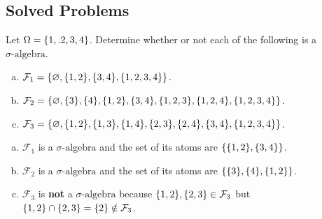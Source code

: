 \newpage

\subsection{Solved Problems}
\begin{problem}
	Let $ \Omega = \{1,.2,3,4\} $. Determine whether or not each of the following is a $\sigma\text{-algebra}$.
	\begin{enumerate}[(a)]
		\item $ \mathcal{F}_1 = \{\varnothing, \{1,2\},\{3,4\},\{1,2,3,4\}\} $.
		\item $ \mathcal{F}_2 = \{\varnothing,\{3\},\{4\},\{1,2\},\{3,4\},\{1,2,3\},\{1,2,4\},\{1,2,3,4\}\} $.
		\item $ \mathcal{F}_3 = \{\varnothing, \{1,2\},\{1,3\},\{1,4\},\{2,3\},\{2,4\},\{3,4\},\{1,2,3,4\}\} $.
	\end{enumerate}
\end{problem}
\begin{solution}
	\begin{enumerate}[(a)]
		$ \, $
		\item $ \mathcal{F}_1  $ is a $\sigma\text{-algebra}$ and the set of its atoms are $ \{\{1,2\},\{3,4\}\} $. 
		\item $ \mathcal{F}_2 $ is a $\sigma\text{-algebra}$ and the set of its atoms are $ \{\{3\},\{4\},\{1,2\}\} $.
		\item $ \mathcal{F}_3 $ is \textbf{not} a $\sigma\text{-algebra}$ because $ \{1,2\},\{2,3\} \in \mathcal{F}_3 $ but $ \{1,2\}\cap\{2,3\} = \{2\} \notin \mathcal{F}_3 $.
 	\end{enumerate}
\end{solution}

